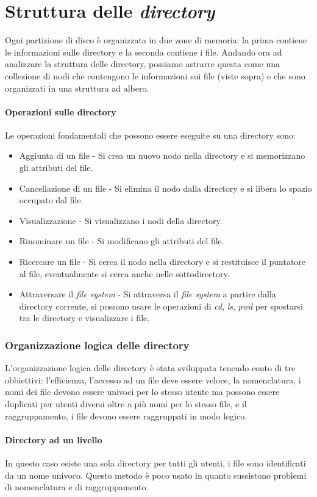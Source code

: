 \section{Struttura delle \textit{directory}}
    Ogni partizione di disco è organizzata in due zone di memoria: la prima contiene le informazioni sulle directory e la seconda contiene i file. Andando ora ad analizzare la struttura delle directory, possiamo astrarre questa come una collezione di nodi che contengono le informazioni sui file (viste sopra) e che sono organizzati in una struttura ad albero. 
    \paragraph{Operazioni sulle directory} Le operazioni fondamentali che possono essere eseguite su una directory sono:
    \begin{itemize}
        \item Aggiunta di un file - Si crea un nuovo nodo nella directory e si memorizzano gli attributi del file.
        \item Cancellazione di un file - Si elimina il nodo dalla directory e si libera lo spazio occupato dal file.
        \item Visualizzazione - Si visualizzano i nodi della directory.
        \item Rinominare un file - Si modificano gli attributi del file.
        \item Ricercare un file - Si cerca il nodo nella directory e si restituisce il puntatore al file, eventualmente si cerca anche nelle sottodirectory.
        \item Attraversare il \textit{file system} - Si attraversa il \textit{file system} a partire dalla directory corrente, si possono usare le operazioni di \textit{cd}, \textit{ls}, \textit{pwd} per spostarsi tra le directory e visualizzare i file.
    \end{itemize}
    \subsubsection{Organizzazione logica delle directory} L'organizzazione logica delle directory è stata sviluppata tenendo conto di tre obbiettivi: l'efficienza, l'accesso ad un file deve essere veloce, la nomenclatura, i nomi dei file devono essere univoci per lo stesso utente ma possono essere duplicati per utenti diversi oltre a più nomi per lo stesso file, e il raggruppamento, i file devono essere raggruppati in modo logico.
        \paragraph{Directory ad un livello} In questo caso esiste una sola directory per tutti gli utenti, i file sono identificati da un nome univoco. Questo metodo è poco usato in quanto sussistono problemi di nomenclatura e di raggruppamento.
